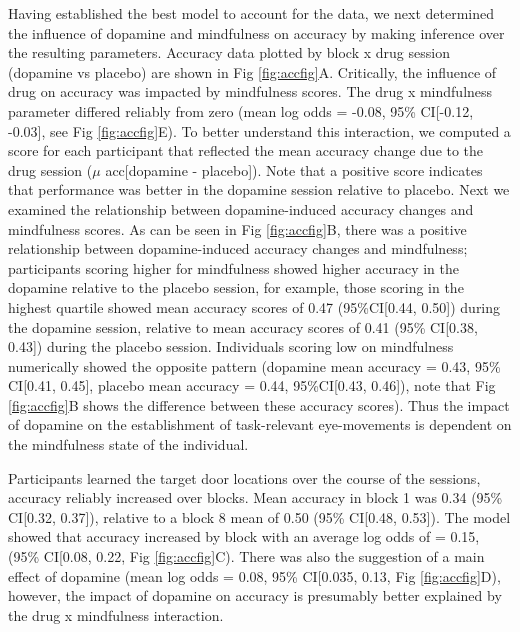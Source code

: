 \documentclass{article}
\begin{document}
Having established the best model to account for the data, we next
determined the influence of dopamine and mindfulness on accuracy by
making inference over the resulting parameters. Accuracy data plotted by
block x drug session (dopamine vs placebo) are shown in Fig
\ref{fig:accfig}A. Critically, the influence of drug on accuracy was
impacted by mindfulness scores. The drug x mindfulness parameter
differed reliably from zero (mean log odds = -0.08, 95\% CI{[}-0.12,
-0.03{]}, see Fig \ref{fig:accfig}E). To better understand this
interaction, we computed a score for each participant that reflected the
mean accuracy change due to the drug session (\(\mu\) acc{[}dopamine -
placebo{]}). Note that a positive score indicates that performance was
better in the dopamine session relative to placebo. Next we examined the
relationship between dopamine-induced accuracy changes and mindfulness
scores. As can be seen in Fig \ref{fig:accfig}B, there was a positive
relationship between dopamine-induced accuracy changes and mindfulness;
participants scoring higher for mindfulness showed higher accuracy in
the dopamine relative to the placebo session, for example, those scoring
in the highest quartile showed mean accuracy scores of 0.47
(95\%CI{[}0.44, 0.50{]}) during the dopamine session, relative to mean
accuracy scores of 0.41 (95\% CI{[}0.38, 0.43{]}) during the placebo
session. Individuals scoring low on mindfulness numerically showed the
opposite pattern (dopamine mean accuracy = 0.43, 95\% CI{[}0.41,
0.45{]}, placebo mean accuracy = 0.44, 95\%CI{[}0.43, 0.46{]}), note
that Fig \ref{fig:accfig}B shows the difference between these accuracy
scores). Thus the impact of dopamine on the establishment of
task-relevant eye-movements is dependent on the mindfulness state of the
individual.

Participants learned the target door locations over the course of the
sessions, accuracy reliably increased over blocks. Mean accuracy in
block 1 was 0.34 (95\% CI{[}0.32, 0.37{]}), relative to a block 8 mean
of 0.50 (95\% CI{[}0.48, 0.53{]}). The model showed that accuracy
increased by block with an average log odds of = 0.15, (95\% CI{[}0.08,
0.22, Fig \ref{fig:accfig}C). There was also the suggestion of a main
effect of dopamine (mean log odds = 0.08, 95\% CI{[}0.035, 0.13, Fig
\ref{fig:accfig}D), however, the impact of dopamine on accuracy is
presumably better explained by the drug x mindfulness interaction.
\end{document}

